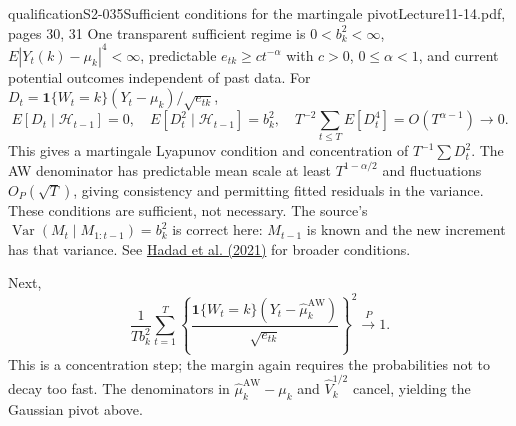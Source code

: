 \begin{reviewnote}{qualification}{S2-035}{Sufficient conditions for the martingale pivot}{Lecture11-14.pdf, pages 30, 31}
One transparent sufficient regime is $0<b_k^2<\infty$, $E|Y_t(k)-\mu_k|^4<\infty$, predictable $e_{tk}\ge c t^{-\alpha}$ with $c>0$, $0\le\alpha<1$, and current potential outcomes independent of past data. For $D_t=\mathbf1\{W_t=k\}(Y_t-\mu_k)/\sqrt{e_{tk}}$,
\[
 E[D_t\mid\mathcal H_{t-1}]=0,\quad E[D_t^2\mid\mathcal H_{t-1}]=b_k^2,\quad
 T^{-2}\sum_{t\le T}E[D_t^4]=O(T^{\alpha-1})\to0.
\]
This gives a martingale Lyapunov condition and concentration of $T^{-1}\sum D_t^2$. The AW denominator has predictable mean scale at least $T^{1-\alpha/2}$ and fluctuations $O_P(\sqrt T)$, giving consistency and permitting fitted residuals in the variance. These conditions are sufficient, not necessary. The source's $\operatorname{Var}(M_t\mid M_{1:t-1})=b_k^2$ is correct here: $M_{t-1}$ is known and the new increment has that variance. See \href{https://pmc.ncbi.nlm.nih.gov/articles/PMC8054003/}{Hadad et al. (2021)} for broader conditions.
\end{reviewnote}


Next,
\[
 \frac1{Tb_k^2}\sum_{t=1}^T
 \left\{\frac{\mathbf1\{W_t=k\}(Y_t-\widehat\mu_k^{\mathrm{AW}})}
 {\sqrt{e_{tk}}}\right\}^{\!2}
 \xrightarrow{P}1.
\]
This is a concentration step; the margin again requires the probabilities not to decay too fast. The denominators in $\widehat\mu_k^{\mathrm{AW}}-\mu_k$ and $\widehat V_k^{1/2}$ cancel, yielding the Gaussian pivot above.

